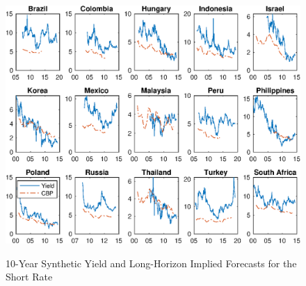 \documentclass{article}
\begin{document}
\begin{figure}[tbph]
	\begin{center}
		\caption{10-Year Synthetic Yield and Long-Horizon Implied Forecasts for the Short Rate}
		\label{fig:YLD10Y_CBP}
		\includegraphics[trim={0cm 0cm 0cm 0cm},clip,height=1\textheight,width=1.4\textwidth]{../Figures/Data/YLD10Y_CBP.eps} \\
	\end{center}
\end{figure}
\end{document}
